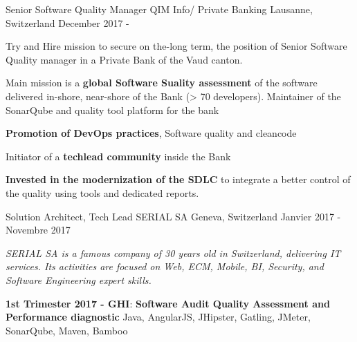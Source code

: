 

\begin{cventries}
    \cventry
    {Senior Software Quality Manager} %
    {QIM Info/ Private Banking} %
    {Lausanne, Switzerland} %
    {December 2017 - } %
    {
        \begin{cvitems} %
            \item {Try and Hire mission to secure on the-long term, the position of Senior Software Quality manager in a Private Bank of the Vaud canton.}		
            \item {Main mission is a \textbf{global Software Suality assessment }of the software delivered in-shore, near-shore of the Bank (> 70 developers). Maintainer of the SonarQube and quality tool platform for the bank}		
            \item {\textbf{Promotion of DevOps practices}, Software quality and cleancode}	
            \item {Initiator of a \textbf{techlead community }inside the Bank}
            \item {\textbf{Invested in the modernization of the SDLC} to integrate a better control of the quality using tools and dedicated reports.}
        \end{cvitems}
    }
    \cventry
    {Solution Architect, Tech Lead} %
    {SERIAL SA} %
    {Geneva, Switzerland} %
    {Janvier 2017 - Novembre 2017} %
    {
        \begin{cvitems} %
            \item {\textit{SERIAL SA is a famous company of 30 years old in Switzerland, delivering IT services. Its activities are focused on Web, ECM, Mobile, BI, Security, and Software Engineering expert skills.}}
            \item { \textbf{1st Trimester 2017 - GHI}: \textbf{Software Audit Quality Assessment and Performance diagnostic} \newline Java, AngularJS, JHipster, Gatling, JMeter, SonarQube, Maven, Bamboo}

\end{cvitems}}
\end{cventries}
